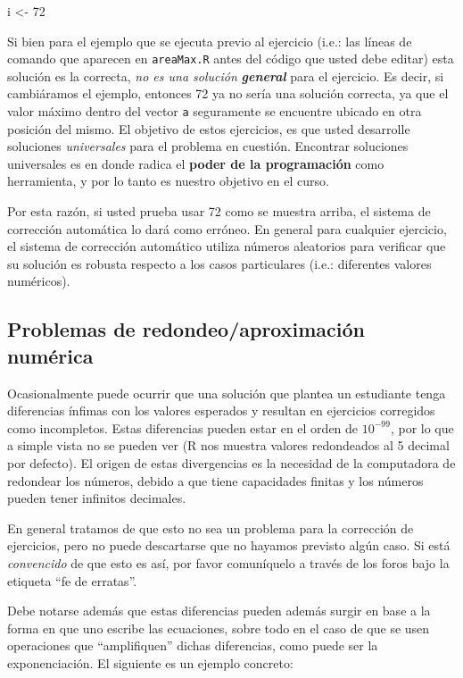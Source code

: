 \documentclass[]{article}
\newenvironment{Shaded}{}{}
\newcommand{\DecValTok}[1]{\textcolor[rgb]{0.25,0.63,0.44}{{#1}}}
\newcommand{\NormalTok}[1]{{#1}}
\begin{document}
\begin{Shaded}
\begin{Highlighting}[]
\NormalTok{i <- }\DecValTok{72}
\end{Highlighting}
\end{Shaded}
Si bien para el ejemplo que se ejecuta previo al ejercicio (i.e.: las
líneas de comando que aparecen en \texttt{areaMax.R} antes del código
que usted debe editar) esta solución es la correcta, \emph{no es una
solución} \emph{\textbf{general}} para el ejercicio. Es decir, si
cambiáramos el ejemplo, entonces 72 ya no sería una solución correcta,
ya que el valor máximo dentro del vector \texttt{a} seguramente se
encuentre ubicado en otra posición del mismo. El objetivo de estos
ejercicios, es que usted desarrolle soluciones \emph{universales} para
el problema en cuestión. Encontrar soluciones universales es en donde
radica el \textbf{poder de la programación} como herramienta, y por lo
tanto es nuestro objetivo en el curso.

Por esta razón, si usted prueba usar 72 como se muestra arriba, el
sistema de corrección automática lo dará como erróneo. En general para
cualquier ejercicio, el sistema de corrección automático utiliza números
aleatorios para verificar que su solución es robusta respecto a los
casos particulares (i.e.: diferentes valores numéricos).

\subsection{Problemas de redondeo/aproximación numérica}

Ocasionalmente puede ocurrir que una solución que plantea un estudiante
tenga diferencias ínfimas con los valores esperados y resultan en
ejercicios corregidos como incompletos. Estas diferencias pueden estar
en el orden de $10 ^ {-99}$, por lo que a simple vista no se pueden ver
(R nos muestra valores redondeados al 5 decimal por defecto). El origen
de estas divergencias es la necesidad de la computadora de redondear los
números, debido a que tiene capacidades finitas y los números pueden
tener infinitos decimales.

En general tratamos de que esto no sea un problema para la corrección de
ejercicios, pero no puede descartarse que no hayamos previsto algún
caso. Si está \emph{convencido} de que esto es así, por favor
comuníquelo a través de los foros bajo la etiqueta ``fe de erratas''.

Debe notarse además que estas diferencias pueden además surgir en base a
la forma en que uno escribe las ecuaciones, sobre todo en el caso de que
se usen operaciones que ``amplifiquen'' dichas diferencias, como puede
ser la exponenciación. El siguiente es un ejemplo concreto:
\end{document}
